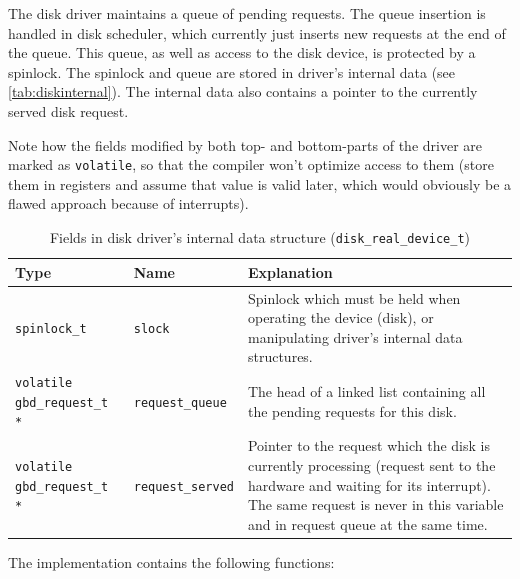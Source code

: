 \documentclass[twoside,a4paper]{report}
\newcommand{\PBS}[1]{\let\temp=\\#1\let\\=\temp}
\newlength{\tablewidth}
\newenvironment{structdescription}{%
\begin{center}%
\begin{tabular}{p{3.5cm}|p{2.5cm}|>{\PBS\raggedright}p{\tablewidth-6\tabcolsep-6cm}}%
\textbf{Type} & \textbf{Name} & \textbf{Explanation} \\ %
}{%
\end{tabular}%
\end{center}%
}
\newcommand{\structfield}[3]{%
\hline%
\texttt{#1} & \texttt{#2} & #3 \\%
}
\begin{document}

The disk driver maintains a queue of pending requests. The queue
insertion is handled in disk scheduler, which currently just inserts
new requests at the end of the queue. This queue, as well as access to
the disk device, is protected by a spinlock. The spinlock and queue
are stored in driver's internal data (see
\autoref{tab:diskinternal}). The internal data also contains a pointer
to the currently served disk request.

Note how the fields modified by both top- and bottom-parts of the
driver are marked as \texttt{volatile}, so that the compiler won't
optimize access to them (store them in registers and assume that value
is valid later, which would obviously be a flawed approach because of
interrupts).

\begin{table}
\begin{center}
\begin{structdescription}

\structfield{spinlock\_t}{slock}{Spinlock which must be held when
operating the device (disk), or manipulating driver's internal data
structures.}

\structfield{volatile gbd\_request\_t *}{request\_queue}{The head of a
linked list containing all the pending requests for this disk.}

\structfield{volatile gbd\_request\_t *}{request\_served}{Pointer to
the request which the disk is currently processing (request sent to
the hardware and waiting for its interrupt). The same request is never
in this variable and in request queue at the same time.}

\end{structdescription}


\caption{Fields in disk driver's internal data structure
(\texttt{disk\_real\_device\_t})}
\label{tab:diskinternal}
\end{center}
\end{table}

The implementation contains the following functions:
\end{document}
